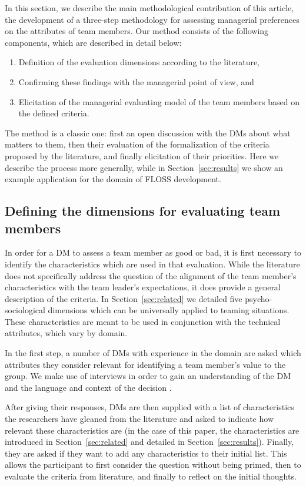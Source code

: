 In this section, we describe the main methodological contribution of this article, the development of a three-step methodology for assessing managerial preferences on the attributes of team members. Our method consists of the following components, which are described in detail below:
\begin{enumerate}
\item Definition of the evaluation dimensions according to the literature,
\item Confirming these findings with the managerial point of view, and
\item Elicitation of the managerial evaluating model of the team members based on the defined criteria.
\end{enumerate}
The method is a classic one: first an open discussion with the DMs about what matters to them, then their evaluation of the formalization of the criteria proposed by the literature, and finally elicitation of their priorities. Here we describe the process more generally, while in Section~\ref{sec:results} we show an example application for the domain of FLOSS development.

\subsection{Defining the dimensions for evaluating team members}

In order for a DM to assess a team member as good or bad, it is first necessary to identify the characteristics which are used in that evaluation. While the literature does not specifically address the question of the alignment of the team member's characteristics with the team leader's expectations, it does provide a general description of the criteria. In Section~\ref{sec:related} we detailed five psycho-sociological dimensions which can be universally applied to teaming situations. These characteristics are meant to be used in conjunction with the technical attributes, which vary by domain. 


In the first step, a number of DMs with experience in the domain are 
asked which attributes they consider relevant for identifying a team member's
value to the group.  We make use of interviews in order to gain an understanding of the DM and
the language and context of the decision \citep{Myers97}.


After giving their responses, DMs are then supplied with a list of characteristics
the researchers have gleaned from the literature and asked to indicate how
relevant these characteristics are (in the case of this paper, the characteristics are introduced in Section~\ref{sec:related} and detailed in Section~\ref{sec:results}). Finally, they are asked if they want to
add any characteristics to their initial list. This allows the participant
to first consider the question without being primed, then to evaluate the
criteria from literature, and finally to reflect on the initial thoughts.

